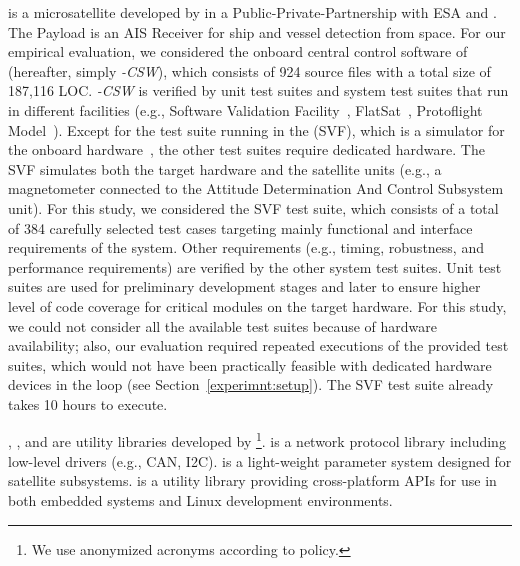 \emph{\SAIL{}} is a microsatellite developed by \TWO{}  in a Public-Private-Partnership with ESA and \ExaE{}. The Payload is an AIS Receiver for ship and vessel detection from space. 
For our empirical evaluation, we considered the onboard central control software of \SAIL{} (hereafter, simply \SAIL{}\emph{-CSW}), which consists of 924 source files with a total size of 187,116 LOC. 
\SAIL{}\emph{-CSW} is verified by unit test suites and system test suites that run in different facilities (e.g., Software Validation Facility~\cite{Isasi2019}, FlatSat~\cite{Eickhoff:Simulate}, Protoflight Model~\cite{ecssHB10A}). 
Except for the test suite running in the  (SVF), which is a simulator for the onboard hardware~\cite{Isasi2019}, the other test suites require dedicated hardware.
The SVF simulates both the target hardware and the satellite units (e.g., a magnetometer connected to the Attitude Determination And Control Subsystem unit).
For this study, we considered the SVF test suite, which
consists of a total of 384 carefully selected test cases targeting mainly functional and interface requirements of the system. 
Other requirements (e.g., timing, robustness, and performance requirements) are verified by the other system test suites.
Unit test suites are used for preliminary development stages and later to ensure 
higher level of code coverage for critical modules on the target hardware.
For this study, we could not consider all the available test suites because of hardware availability; also, our evaluation required repeated executions of the provided test suites, which would not have been practically feasible with dedicated hardware devices in the loop (see Section~\ref{experimnt:setup}).
The SVF test suite already takes 10 hours to execute.


\GCSP{}, \PARAM{}, and \UTIL{}  are utility libraries developed by \ONE\footnote{We use anonymized acronyms according to \ONE policy.}.
\emph{\GCSP{}} is a network protocol library including low-level drivers (e.g., CAN, I2C).
{\PARAM{}} is a light-weight parameter system designed for \ONE satellite subsystems. 
{\UTIL{}} is a utility library providing cross-platform APIs for use in both embedded systems and Linux development environments.

